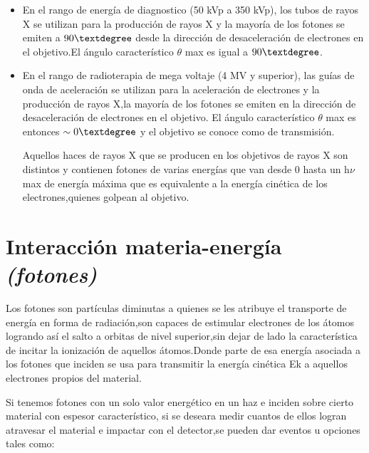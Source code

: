 \documentclass[12pt,fleqn]{book} %
\numberwithin{equation}{section} %
\numberwithin{figure}{section} %
\numberwithin{table}{section} %
\begin{document}
\begin{itemize}

\item 
 En el rango de energía de diagnostico (50 kVp a 350 kVp), los tubos de rayos X se utilizan para la producción de rayos X y la mayoría de los fotones se emiten a $ 90\textdegree$ desde la dirección de desaceleración de electrones en el objetivo.El ángulo característico $\theta$ max es igual a $90\textdegree$.



\item
 En el rango de radioterapia de mega voltaje (4 MV y superior), las guías de onda de aceleración se utilizan para la aceleración de electrones y la producción de rayos X,la mayoría de los fotones se emiten en la dirección de desaceleración de electrones en el objetivo. El ángulo característico $\theta$ max es entonces  $\sim 0\textdegree$ y el objetivo se conoce como de transmisión.

Aquellos haces de rayos X que se producen en los objetivos de rayos X son distintos y contienen fotones de varias energías que van desde $0$ hasta un h$\nu$ max de energía máxima que es equivalente a la energía cinética de los electrones,quienes golpean al objetivo.



 \end{itemize} 
 
 
\section{Interacción materia-energía \textit{(fotones)}}

Los fotones son partículas diminutas a quienes se les atribuye el transporte de energía en forma de radiación,son capaces de estimular electrones de los átomos logrando así el salto a orbitas de nivel superior,sin dejar de lado la característica de incitar la ionización de aquellos átomos.Donde parte de esa energía asociada a los fotones que inciden se usa para transmitir la energía cinética Ek a aquellos electrones propios del material.

Si tenemos  fotones con un solo valor energético en un haz e inciden sobre cierto material con espesor característico, si se deseara medir cuantos de ellos logran atravesar el material e impactar con el detector,se pueden dar eventos u opciones tales como:
\end{document}
